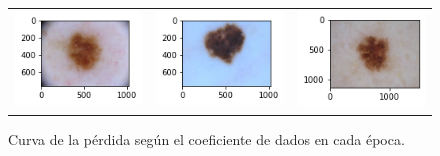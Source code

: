 \begin{figure}[!b]
\begin{tabular}{ccc}
        \includegraphics[width=4cm]{../Plots/THR/sample_12.png} &
        \includegraphics[width=4cm]{../Plots/THR/sample_13.png} &
        \includegraphics[width=4cm]{../Plots/THR/sample_14.png} \\

    \end{tabular}        
    \caption{Curva de la pérdida según el coeficiente de dados en cada época.}
    \label{fig:thresh_input}
\end{figure}


